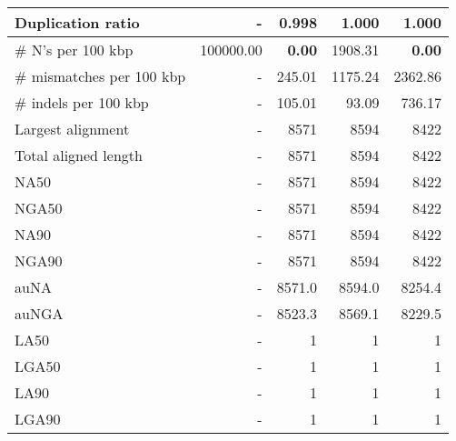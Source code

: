 \documentclass[12pt,a4paper]{article}
\begin{document}
\begin{table}[ht]
\begin{center}
\begin{tabular}{|l*{4}{|r}|}
Duplication ratio & - & 0.998 & 1.000 & 1.000 \\ \hline
\# N's per 100 kbp & 100000.00 & {\bf 0.00} & 1908.31 & {\bf 0.00} \\ \hline
\# mismatches per 100 kbp & - & 245.01 & 1175.24 & 2362.86 \\ \hline
\# indels per 100 kbp & - & 105.01 & 93.09 & 736.17 \\ \hline
Largest alignment & - & 8571 & 8594 & 8422 \\ \hline
Total aligned length & - & 8571 & 8594 & 8422 \\ \hline
NA50 & - & 8571 & 8594 & 8422 \\ \hline
NGA50 & - & 8571 & 8594 & 8422 \\ \hline
NA90 & - & 8571 & 8594 & 8422 \\ \hline
NGA90 & - & 8571 & 8594 & 8422 \\ \hline
auNA & - & 8571.0 & 8594.0 & 8254.4 \\ \hline
auNGA & - & 8523.3 & 8569.1 & 8229.5 \\ \hline
LA50 & - & 1 & 1 & 1 \\ \hline
LGA50 & - & 1 & 1 & 1 \\ \hline
LA90 & - & 1 & 1 & 1 \\ \hline
LGA90 & - & 1 & 1 & 1 \\ \hline
\end{tabular}
\end{center}
\end{table}
\end{document}
